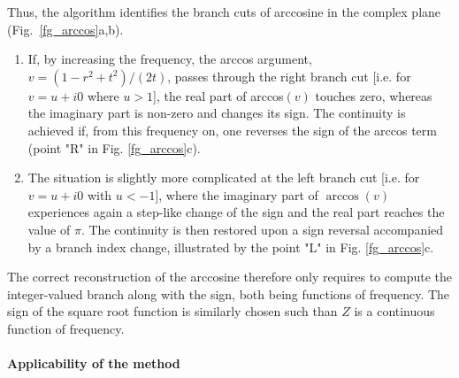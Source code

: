 Thus, the algorithm identifies the branch cuts of arccosine in the complex plane (Fig.\ \ref{fg_arccos}a,b). 
\begin{enumerate}
\item{
If, by increasing the frequency, the arccos argument, $v = (1 - r^2+t^2)/(2 t)$, passes through the right branch cut [i.e.  for $v= u+i 0$ where $u>1$], the real part of arccos$(v)$ touches zero, whereas the imaginary part is non-zero and changes its sign. The continuity is achieved if, from this frequency on, one reverses the sign of the arccos term (point "R" in Fig. \ref{fg_arccos}c). 
} 
\item{
The situation is slightly more complicated at the left branch cut [i.e. for $v = u+i 0$ with $u<-1$], where the imaginary part of $\arccos(v)$ experiences again a step-like change of the sign and the real part reaches the value of $\pi$. The continuity is then restored upon a sign reversal accompanied by a branch index change,  illustrated by the point "L" in Fig. \ref{fg_arccos}c. 
} 
 \end{enumerate}
The correct reconstruction of the arccosine therefore only requires to compute the integer-valued branch along with the sign, both being functions of frequency. The sign of the square root function is similarly chosen such than $Z$ is a continuous function of frequency.  


\paragraph{Applicability of the method}%



